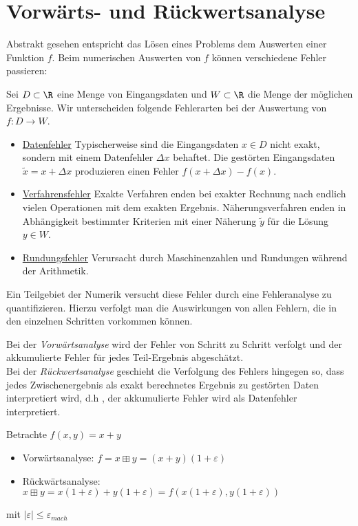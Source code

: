 \section{Vorwärts- und Rückwertsanalyse}
Abstrakt gesehen entspricht das Lösen eines Problems dem Auswerten einer Funktion $f$.
Beim numerischen Auswerten von $f$ können verschiedene Fehler passieren:

\begin{definition}[Fehlerarten]
Sei $D \subset \R$ eine Menge von Eingangsdaten und $W \subset \R$ die Menge der möglichen Ergebnisse. Wir unterscheiden folgende Fehlerarten bei der Auswertung von $f \colon D \to W$.
\begin{itemize}
\item \underline{Datenfehler} Typischerweise sind die Eingangsdaten $x \in D$ nicht exakt,
sondern mit einem Datenfehler $\Delta x$ behaftet. Die gestörten Eingangsdaten $\tilde{x}=x+ \Delta x$ produzieren einen Fehler $f(x+\Delta x)-f(x)$.
\item \underline{Verfahrensfehler} Exakte Verfahren enden bei exakter Rechnung nach endlich vielen Operationen mit dem exakten Ergebnis.
Näherungsverfahren enden in Abhängigkeit bestimmter Kriterien mit einer Näherung $\tilde{y}$ für die Lösung $y \in W$.
\item \underline{Rundungsfehler} Verursacht durch Maschinenzahlen und Rundungen während der Arithmetik.
\end{itemize}
\end{definition}
Ein Teilgebiet der Numerik versucht diese Fehler durch eine Fehleranalyse zu quantifizieren.
Hierzu verfolgt man die Auswirkungen von allen Fehlern, die in den einzelnen Schritten vorkommen können.
\begin{definition}[Analysearten]
Bei der \emph{Vorwärtsanalyse} wird der Fehler von Schritt zu Schritt verfolgt und der akkumulierte Fehler für jedes Teil-Ergebnis abgeschätzt. \\
Bei der \emph{Rückwertsanalyse} geschieht die Verfolgung des Fehlers hingegen so, dass jedes Zwischenergebnis als exakt berechnetes Ergebnis zu gestörten Daten interpretiert wird, d.h , der akkumulierte Fehler wird als Datenfehler interpretiert.
\end{definition}
\begin{example}
Betrachte $f(x,y)=x+y$ \\
\begin{itemize}
	\item Vorwärtsanalyse: $\boxed{f} = x \boxplus y= (x+y)(1+\varepsilon)$
	\item Rückwärtsanalyse: $x \boxplus y= x(1+\varepsilon)+y(1+\varepsilon)= f(x(1+\varepsilon), y(1+\varepsilon))$
\end{itemize}
mit $|\varepsilon|\le \varepsilon_{mach}$
\end{example}
